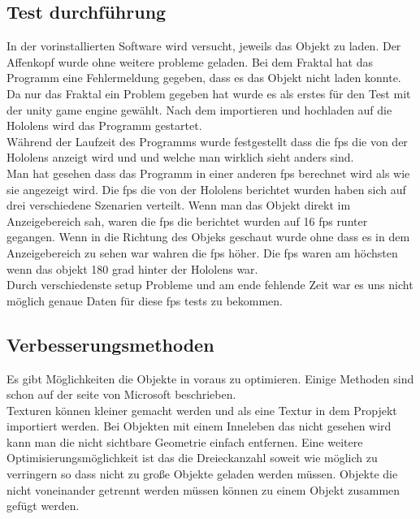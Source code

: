 \subsection{Test durchführung}\label{subsec:Test durchführung}
In der vorinstallierten Software wird versucht, jeweils das Objekt zu laden.
Der Affenkopf wurde ohne weitere probleme geladen.
Bei dem Fraktal hat das Programm eine Fehlermeldung gegeben, dass es das Objekt nicht laden konnte.\\
Da nur das Fraktal ein Problem gegeben hat wurde es als erstes für den Test mit der unity game engine \autocite{unity} gewählt.
Nach dem importieren und hochladen auf die Hololens wird das Programm gestartet.\\
Während der Laufzeit des Programms wurde festgestellt dass die fps die von der Hololens anzeigt wird und und welche man wirklich sieht anders sind.\\
Man hat gesehen dass das Programm in einer anderen fps berechnet wird als wie sie angezeigt wird.
Die fps die von der Hololens berichtet wurden haben sich auf drei verschiedene Szenarien verteilt.
Wenn man das Objekt direkt im Anzeigebereich sah, waren die fps die berichtet wurden auf 16 fps runter gegangen.
Wenn in die Richtung des Objeks geschaut wurde ohne dass es in dem Anzeigebereich zu sehen war wahren die fps höher.
Die fps waren am höchsten wenn das objekt 180 grad hinter der Hololens war.\\
Durch verschiedenste setup Probleme und am ende fehlende Zeit war es uns nicht möglich genaue Daten für diese fps tests zu bekommen.

\subsection{Verbesserungsmethoden}\label{subsec:Verbesserungsmethoden}

Es gibt Möglichkeiten die Objekte in voraus zu optimieren.
Einige Methoden sind schon auf der seite von Microsoft \autocite{best_practices} beschrieben.\\
Texturen können kleiner gemacht werden und als eine Textur in dem Propjekt importiert werden.
Bei Objekten mit einem Inneleben das nicht gesehen wird kann man die nicht sichtbare Geometrie einfach entfernen.
Eine weitere Optimisierungsmöglichkeit ist das die Dreieckanzahl soweit wie möglich zu verringern so dass nicht zu große Objekte geladen werden müssen.
Objekte die nicht voneinander getrennt werden müssen können zu einem Objekt zusammen gefügt werden.

